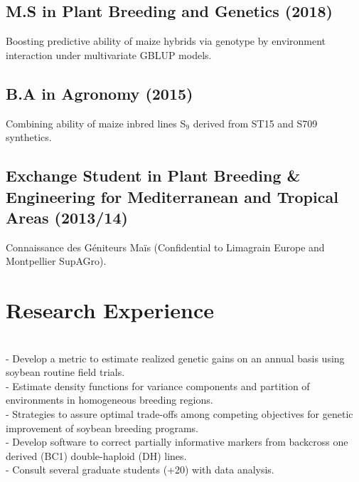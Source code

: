 \documentclass[]{mdkrause_cv_openfont}
\begin{document}
\begin{minipage}[t]{1\textwidth}
\subsection{M.S in Plant Breeding and Genetics (2018)}
 Boosting predictive ability of maize hybrids via genotype by environment interaction under multivariate GBLUP models.

\sectionsep
\vspace{0.2 mm}

\subsection{B.A in Agronomy (2015)}
 Combining ability of maize inbred lines S$_9$ derived from ST15 and S709 synthetics.

\sectionsep
\vspace{0.2 mm}

\subsection{Exchange Student in Plant Breeding \& Engineering for Mediterranean and Tropical Areas (2013/14)}
 Connaissance des Géniteurs Maïs (Confidential to Limagrain Europe and Montpellier SupAGro).

\sectionsep


\section{Research Experience}

\sectionsep

 \\
- Develop a metric to estimate realized genetic gains on an annual basis using soybean routine field trials. \\
- Estimate density functions for variance components and partition of environments in homogeneous breeding regions.\\
- Strategies to assure optimal trade-offs among competing objectives for genetic 
improvement of soybean breeding programs. \\
- Develop software to correct partially informative markers from backcross one derived (BC1) double-haploid (DH) lines. \\
- Consult several graduate students (+20) with data analysis.


\end{minipage}
\end{document}
